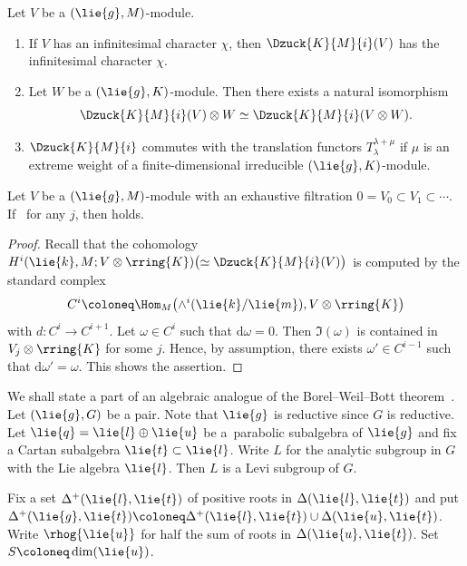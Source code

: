 \begin{Fact}\label{fact:BasicZuckerman}
	Let $V$ be a $(\lie{g}, M)$-module.
	\begin{enumerate}\itemsep=0pt
		\item[$1.$] If $V$ has an infinitesimal character $\chi$, then $\Dzuck{K}{M}{i}(V)$ has the infinitesimal character $\chi$.
		\item[$2.$] Let $W$ be a $(\lie{g}, K)$-module. Then there exists a natural isomorphism \[\Dzuck{K}{M}{i}(V)\otimes W \simeq \Dzuck{K}{M}{i}(V\otimes W).\]
		\item[$3.$] $\Dzuck{K}{M}{i}$ commutes with the translation functors $T_{\lambda}^{\lambda + \mu}$ if $\mu$ is an extreme weight of a finite-dimensional irreducible $(\lie{g}, K)$-module.
	\end{enumerate}
\end{Fact}


\begin{Lemma}\label{lem:LimitZuckerman}
	Let $V$ be a $(\lie{g}, M)$-module with an exhaustive filtration
	$0 = V_0 \subset V_1 \subset \cdots $.
	If~ for any $j$, then  holds.
\end{Lemma}
	
\begin{proof}
	Recall that the cohomology $H^i(\lie{k}, M; V \otimes \rring{K})\bigl(\simeq \Dzuck{K}{M}{i}(V)\bigr)$ is computed by the standard complex
	\begin{align*}
		C^i\coloneq \Hom_{M}\bigl(\wedge^i(\lie{k}/\lie{m}), V \otimes \rring{K}\bigr)
	\end{align*}
	with $d\colon C^i \rightarrow C^{i+1}$.
	Let $\omega \in C^i$ such that $\mathrm{d}\omega = 0$.
	Then $\Im(\omega)$ is contained in $V_j \otimes \rring{K}$ for some $j$.
	Hence, by assumption, there exists $\omega' \in C^{i-1}$ such that $\mathrm{d}\omega'=\omega$.
	This shows the assertion.
\end{proof}

We shall state a part of an algebraic analogue of the Borel--Weil--Bott theorem~\cite[Corollary~4.160]{KnVo95_cohomological_induction}.
Let $(\lie{g}, G)$ be a pair.
Note that $\lie{g}$ is reductive since $G$ is reductive.
Let $\lie{q} = \lie{l} \oplus \lie{u}$ be a~parabolic subalgebra of $\lie{g}$
and fix a Cartan subalgebra $\lie{t}\subset \lie{l}$.
Write $L$ for the analytic subgroup in $G$ with the Lie algebra $\lie{l}$.
Then $L$ is a Levi subgroup of $G$.

Fix a set $\Delta^+(\lie{l}, \lie{t})$ of positive roots in $\Delta(\lie{l}, \lie{t})$
and put $\Delta^+(\lie{g}, \lie{t}) \coloneq \Delta^+(\lie{l}, \lie{t})\cup \Delta(\lie{u}, \lie{t})$.
Write $\rhog{\lie{u}}$ for half the sum of roots in $\Delta(\lie{u}, \lie{t})$.
Set $S \coloneq \dim(\lie{u})$.

